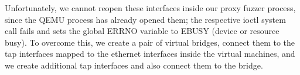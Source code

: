 Unfortunately, we cannot reopen these interfaces inside our proxy fuzzer process, since the QEMU
process has already opened them; the respective ioctl system call fails and sets the
global ERRNO variable to EBUSY (device or resource busy). To overcome this, we create a pair of
virtual bridges, connect them to the tap interfaces mapped to the ethernet interfaces inside the virtual
machines, and we create additional tap interfaces and also connect them to the bridge.








